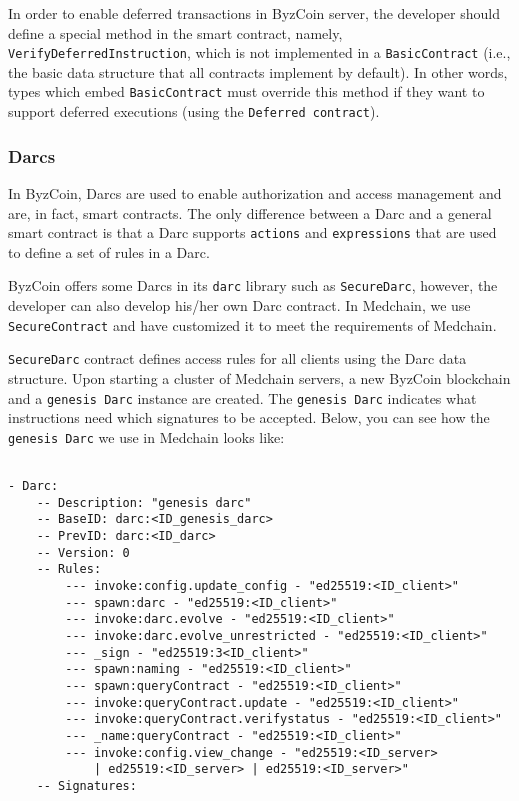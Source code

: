 In order to enable deferred transactions in ByzCoin server, the developer should define a special method in the smart contract, namely, \texttt{VerifyDeferredInstruction}, which is not implemented in a \texttt{BasicContract} (i.e., the basic data structure that all contracts implement by default). In other words, types which embed \texttt{BasicContract} must override this method if they want to support deferred executions (using the \texttt{Deferred contract}). 

\subsubsection{Darcs} \label{impl:darcs}
In ByzCoin, Darcs are used to enable authorization and access management and are, in fact, smart contracts. The only difference between a Darc and a general smart contract is that a Darc supports \texttt{actions} and \texttt{expressions} that are used to define a set of rules in a Darc.

ByzCoin offers some Darcs in its \texttt{darc} library such as \texttt{SecureDarc}, however, the developer can also develop his/her own Darc contract. In Medchain, we use \texttt{SecureContract} and have customized it to meet the requirements of Medchain. 

\texttt{SecureDarc} contract defines access rules for all clients using the Darc data structure. Upon starting a cluster of Medchain servers, a new ByzCoin blockchain and a \texttt{genesis Darc} instance are created. The \texttt{genesis Darc} indicates what instructions need which signatures to be accepted. Below, you can see how the \texttt{genesis Darc} we use in Medchain looks like:

\begin{verbatim}

- Darc:
    -- Description: "genesis darc"
    -- BaseID: darc:<ID_genesis_darc>
    -- PrevID: darc:<ID_darc>
    -- Version: 0
    -- Rules:
        --- invoke:config.update_config - "ed25519:<ID_client>"
        --- spawn:darc - "ed25519:<ID_client>"
        --- invoke:darc.evolve - "ed25519:<ID_client>"
        --- invoke:darc.evolve_unrestricted - "ed25519:<ID_client>"
        --- _sign - "ed25519:3<ID_client>"
        --- spawn:naming - "ed25519:<ID_client>"
        --- spawn:queryContract - "ed25519:<ID_client>"
        --- invoke:queryContract.update - "ed25519:<ID_client>"
        --- invoke:queryContract.verifystatus - "ed25519:<ID_client>"
        --- _name:queryContract - "ed25519:<ID_client>"
        --- invoke:config.view_change - "ed25519:<ID_server> 
            | ed25519:<ID_server> | ed25519:<ID_server>"
    -- Signatures:
    
\end{verbatim}

